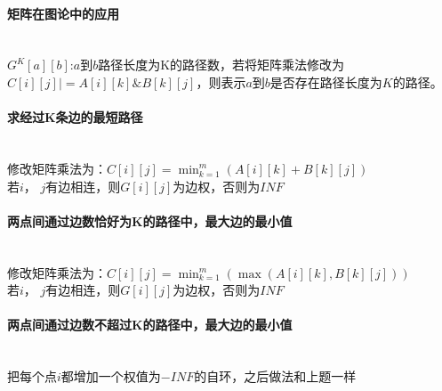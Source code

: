 \paragraph{矩阵在图论中的应用}~{}
\\
$G^{K}[a][b]$:$a$到$b$路径长度为K的路径数，若将矩阵乘法修改为$C[i][j] |= A[i][k]\&B[k][j]$，则表示$a$到$b$是否存在路径长度为$K$的路径。\\
\paragraph{求经过K条边的最短路径}~{}
\\
修改矩阵乘法为：$C[i][j]=\min_{k=1}^{m}(A[i][k]+B[k][j])$\\
若$i$，	$j$有边相连，则$G[i][j]$为边权，否则为$INF$\\
\paragraph{两点间通过边数恰好为K的路径中，最大边的最小值}~{}
\\
修改矩阵乘法为：$C[i][j]=\min_{k=1}^{m}(\max(A[i][k], B[k][j]))$\\
若$i$，	$j$有边相连，则$G[i][j]$为边权，否则为$INF$\\
\paragraph{两点间通过边数不超过K的路径中，最大边的最小值}~{}
\\
把每个点$i$都增加一个权值为$-INF$的自环，之后做法和上题一样